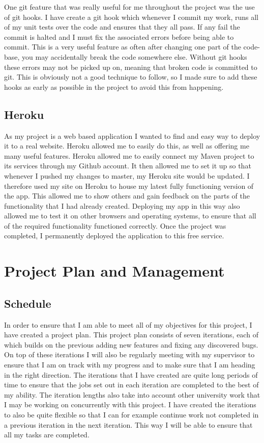 One git feature that was really useful for me throughout the project was the use of git hooks. I have create a git hook which whenever I commit my work, runs all of my unit tests over the code and ensures that they all pass. If any fail the commit is halted and I must fix the associated errors before being able to commit. This is a very useful feature as often after changing one part of the code-base, you may accidentally break the code somewhere else. Without git hooks these errors may not be picked up on, meaning that broken code is committed to git.  This is obviously not a good technique to follow, so I made sure to add these hooks as early as possible in the project to avoid this from happening.

\subsection{Heroku}
As my project is a web based application I wanted to find and easy way to deploy it to a real website. Heroku allowed me to easily do this, as well as offering me many useful features. Heroku allowed me to easily connect my Maven project to its services through my Github account. It then allowed me to set it up so that whenever I pushed my changes to master, my Heroku site would be updated. I therefore used my site on Heroku to house my latest fully functioning version of the app. This allowed me to show others and gain feedback on the parts of the functionality that I had already created. Deploying my app in this way also allowed me to test it on other browsers and operating systems, to ensure that all of the required functionality functioned correctly. Once the project was completed, I permanently deployed the application to this free service.


\section{Project Plan and Management}

\subsection{Schedule}

In order to ensure that I am able to meet all of my objectives for this project, I have created a project plan. This project plan consists of seven iterations, each of which builds on the previous adding new features and fixing any discovered bugs. On top of these iterations I will also be regularly meeting with my supervisor to ensure that I am on track with my progress and to make sure that I am heading in the right direction. The iterations that I have created are quite long periods of time to ensure that the jobs set out in each iteration are completed to the best of my ability. The iteration lengths also take into account other university work that I may be working on concurrently with this project. I have created the iterations to also be quite flexible so that I can for example continue work not completed in a previous iteration in the next iteration. This way I will be able to ensure that all my tasks are completed. 


